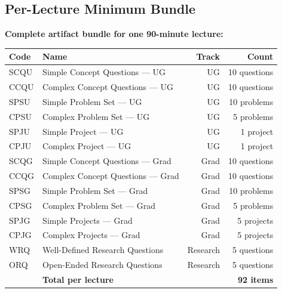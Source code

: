 \documentclass[11pt,a4paper]{article}
\begin{document}
\subsection{Per-Lecture Minimum Bundle}

\begin{tcolorbox}[goldbox]
\textbf{Complete artifact bundle for one 90-minute lecture:}

\medskip
\begin{center}
\begin{tabular}{llrr}
\toprule
\textbf{Code} & \textbf{Name} & \textbf{Track} & \textbf{Count}\\
\midrule
SCQU & Simple Concept Questions --- UG   & UG       & 10 questions\\
CCQU & Complex Concept Questions --- UG  & UG       & 10 questions\\
SPSU & Simple Problem Set --- UG         & UG       & 10 problems\\
CPSU & Complex Problem Set --- UG        & UG       & 5 problems\\
SPJU & Simple Project --- UG             & UG       & 1 project\\
CPJU & Complex Project --- UG            & UG       & 1 project\\
\midrule
SCQG & Simple Concept Questions --- Grad & Grad     & 10 questions\\
CCQG & Complex Concept Questions --- Grad& Grad     & 10 questions\\
SPSG & Simple Problem Set --- Grad       & Grad     & 10 problems\\
CPSG & Complex Problem Set --- Grad      & Grad     & 5 problems\\
SPJG & Simple Projects --- Grad         & Grad     & 5 projects\\
CPJG & Complex Projects --- Grad        & Grad     & 5 projects\\
\midrule
WRQ  & Well-Defined Research Questions   & Research & 5 questions\\
ORQ  & Open-Ended Research Questions     & Research & 5 questions\\
\midrule
 & \textbf{Total per lecture}           &          & \textbf{92 items}\\
\bottomrule
\end{tabular}
\end{center}
\end{tcolorbox}

\end{document}
